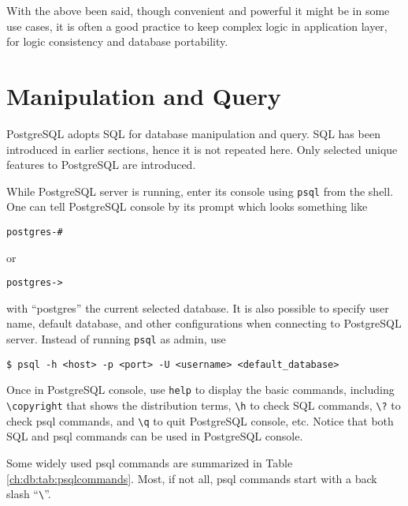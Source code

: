 With the above been said, though convenient and powerful it might be in some use cases, it is often a good practice to keep complex logic in application layer, for logic consistency and database portability.

\section{Manipulation and Query}

PostgreSQL adopts SQL for database manipulation and query. SQL has been introduced in earlier sections, hence it is not repeated here. Only selected unique features to PostgreSQL are introduced.

While PostgreSQL server is running, enter its console using \verb|psql| from the shell. One can tell PostgreSQL console by its prompt which looks something like
\begin{lstlisting}
postgres-#
\end{lstlisting}
or
\begin{lstlisting}
postgres->
\end{lstlisting}
with ``postgres'' the current selected database. It is also possible to specify user name, default database, and other configurations when connecting to PostgreSQL server. Instead of running \verb|psql| as admin, use
\begin{lstlisting}
$ psql -h <host> -p <port> -U <username> <default_database>
\end{lstlisting}

Once in PostgreSQL console, use \verb|help| to display the basic commands, including \verb|\copyright| that shows the distribution terms, \verb|\h| to check SQL commands, \verb|\?| to check psql commands, and \verb|\q| to quit PostgreSQL console, etc. Notice that both SQL and psql commands can be used in PostgreSQL console.

Some widely used psql commands are summarized in Table \ref{ch:db:tab:psqlcommands}. Most, if not all, psql commands start with a back slash ``\verb|\|''.

